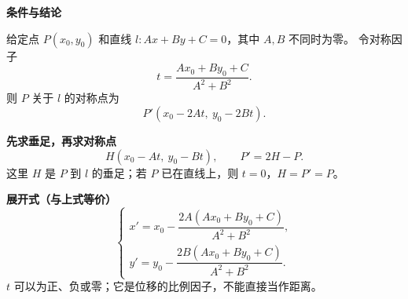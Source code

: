 \begin{statementbox}
\textbf{\textcolor{CStatement}{条件与结论}}

给定点 $P(x_0,y_0)$ 和直线 $l:Ax+By+C=0$，其中 $A,B$ 不同时为零。
令对称因子
\[
 t=\frac{Ax_0+By_0+C}{A^2+B^2}.
\]
则 $P$ 关于 $l$ 的对称点为
\[
 \boxed{P'(x_0-2At,\ y_0-2Bt)}.
\]


\textbf{\textcolor{CStatement}{先求垂足，再求对称点}}
\[
 H(x_0-At,\ y_0-Bt),\qquad P'=2H-P.
\]
这里 $H$ 是 $P$ 到 $l$ 的垂足；若 $P$ 已在直线上，则 $t=0$，$H=P'=P$。

\medskip
\textbf{\textcolor{CStatement}{展开式（与上式等价）}}
\[
\begin{cases}
 x'=x_0-\dfrac{2A(Ax_0+By_0+C)}{A^2+B^2},\\[7pt]
 y'=y_0-\dfrac{2B(Ax_0+By_0+C)}{A^2+B^2}.
\end{cases}
\]
$t$ 可以为正、负或零；它是位移的比例因子，不能直接当作距离。
\end{statementbox}
